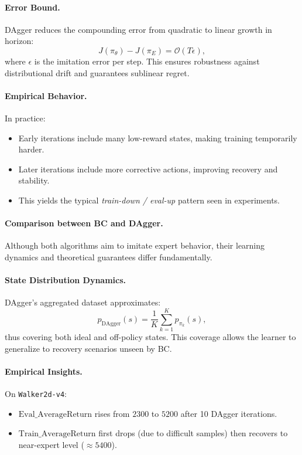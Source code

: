 \documentclass[12pt]{article}
\begin{document}
\paragraph{Error Bound.}
DAgger reduces the compounding error from quadratic to linear growth in horizon:
\[
J(\pi_\theta) - J(\pi_E) = \mathcal{O}(T \epsilon),
\]
where $\epsilon$ is the imitation error per step.  
This ensures robustness against distributional drift and guarantees sublinear regret.

\paragraph{Empirical Behavior.}
In practice:
\begin{itemize}
    \item Early iterations include many low-reward states, making training temporarily harder.
    \item Later iterations include more corrective actions, improving recovery and stability.
    \item This yields the typical \textit{train-down / eval-up} pattern seen in experiments.
\end{itemize}

\paragraph{Comparison between BC and DAgger.}
Although both algorithms aim to imitate expert behavior, their learning dynamics and theoretical guarantees differ fundamentally. 

\paragraph{State Distribution Dynamics.}
DAgger’s aggregated dataset approximates:
\[
p_{\text{DAgger}}(s)
= \frac{1}{K} \sum_{k=1}^{K} p_{\pi_k}(s),
\]
thus covering both ideal and off-policy states. 
This coverage allows the learner to generalize to recovery scenarios unseen by BC.

\paragraph{Empirical Insights.}
On \texttt{Walker2d-v4}:
\begin{itemize}
    \item $\text{Eval\_AverageReturn}$ rises from $2300$ to $5200$ after 10 DAgger iterations.
    \item $\text{Train\_AverageReturn}$ first drops (due to difficult samples) then recovers to near-expert level ($\approx 5400$).
\end{itemize}
\end{document}
